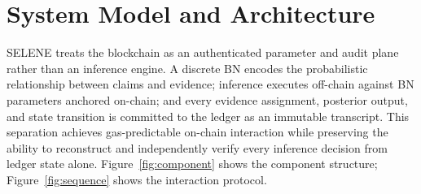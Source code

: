 \documentclass[journal]{IEEEtran}
\begin{document}
\begin{table}[t]
\centering
\caption{Comparison of oracle designs along inference,
accountability, and gas cost dimensions.}
\label{tab:oracle-comparison}
\end{table}


\section{System Model and Architecture}
\label{sec:proposed-methodology}

SELENE treats the blockchain as an authenticated parameter
and audit plane rather than an inference engine.
A discrete BN encodes the probabilistic relationship
between claims and evidence; inference executes off-chain
against BN parameters anchored on-chain; and every
evidence assignment, posterior output, and state
transition is committed to the ledger as an immutable
transcript.
This separation achieves gas-predictable on-chain
interaction while preserving the ability to reconstruct
and independently verify every inference decision from
ledger state alone.
Figure~\ref{fig:component} shows the component structure;
Figure~\ref{fig:sequence} shows the interaction protocol.
\end{document}
